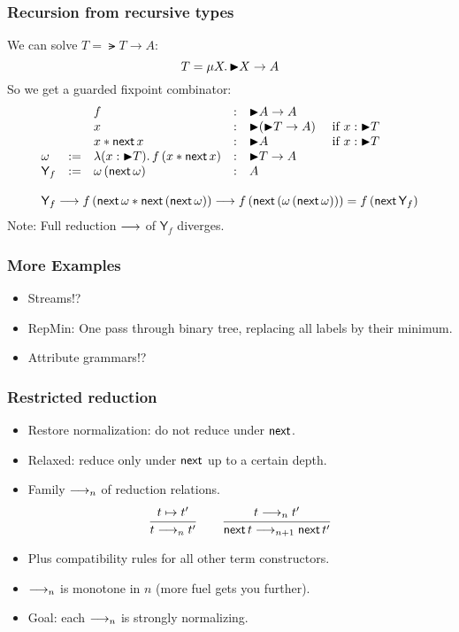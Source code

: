 \documentclass[t]{beamer}
\newcommand{\nex}{\tnext\,}
\newcommand{\Y}{\mathsf{Y}}
\newcommand{\muT}[2]{\mu {#1} \hspace{-0.1em} . \,  {#2}}
\begin{document}
\begin{frame}%
  \frametitle{Recursion from recursive types}

We can solve $T = \lat T \to A$:
\[
T = \muT X {\lat X \to A}
\]
So we get a guarded fixpoint combinator:
\[
\begin{array}{lllllll}
  &&f & : & \lat A \to A \\
  && x & : & \lat (\lat T \to A) & \mif{ x : \lat T} \\
  && x \ast \nex x & : & \lat A & \mif{ x : \lat T} \\
  \omega & := & \lambda (x : \lat T). \, f\,(x \ast \nex x) & : & \lat T \to A \\
  \Y_f     & := & \omega \, (\nex \omega) & : & A \\
\\
\multicolumn 7 l {
  \Y_f \red f\,(\nex \omega \ast \nex (\nex \omega)) \red
  f\,(\nex (\omega \, (\nex \omega))) = f\, (\nex \Y_f)
}
\end{array}
\]
Note: Full reduction $\longrightarrow$ of $\Y_f$ diverges.
\end{frame}


\begin{frame}%
  \frametitle{More Examples}
  \begin{itemize}
  \item Streams!?
  \item RepMin: One pass through binary tree, replacing all labels by their
    minimum.
  \item Attribute grammars!?
  \end{itemize}
\end{frame}



\begin{frame}%
  \frametitle{Restricted reduction}
  \begin{itemize}
  \item Restore normalization: do not reduce under $\mathsf{next}$.
  \item Relaxed: reduce only under $\mathsf{next}$ up to a certain depth.
  \item Family $\longrightarrow_n$ of reduction relations.
\[
  \ru{t \contr t'}{t \red_n t'}
\qquad
  \ru{t \red_n t'}{\nex t \red_{n+1} \nex t'}
\]
  \item Plus compatibility rules for all other term constructors.
  \item $\longrightarrow_n$ is monotone in $n$  (more fuel gets you further).
  \item Goal: each $\longrightarrow_n$ is strongly normalizing.
  \end{itemize}
\end{frame}
\end{document}

